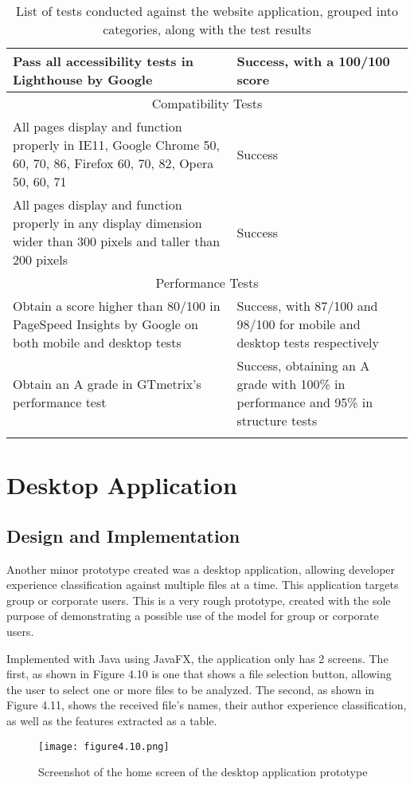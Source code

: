 \documentclass{report}
\begin{document}
\begin{longtable}[h!]{m{23em}|m{13em}}
\hline
Pass all accessibility tests in Lighthouse by Google & Success, with a 100/100 score \\
\hline
\multicolumn{2}{c}{Compatibility Tests} \\
\hline
All pages display and function properly in IE11, Google Chrome 50, 60, 70, 86, Firefox 60, 70, 82, Opera 50, 60, 71 & Success \\
\hline
All pages display and function properly in any display dimension wider than 300 pixels and taller than 200 pixels & Success \\
\hline
\multicolumn{2}{c}{Performance Tests} \\
\hline
Obtain a score higher than 80/100 in PageSpeed Insights by Google on both mobile and desktop tests & Success, with 87/100 and 98/100 for mobile and desktop tests respectively \\
\hline
Obtain an A grade in GTmetrix’s performance test & Success, obtaining an A grade with 100\% in performance and 95\% in structure tests \\
\hline
\caption{List of tests conducted against the website application, grouped into categories, along with the test results}
\label{tab:4.2}
\end{longtable}

\section{Desktop Application}

\subsection{Design and Implementation}

Another minor prototype created was a desktop application, allowing developer experience classification against multiple files at a time. This application targets group or corporate users. This is a very rough prototype, created with the sole purpose of demonstrating a possible use of the model for group or corporate users.

Implemented with Java using JavaFX, the application only has 2 screens. The first, as shown in Figure 4.10 is one that shows a file selection button, allowing the user to select one or more files to be analyzed. The second, as shown in Figure 4.11, shows the received file’s names, their author experience classification, as well as the features extracted as a table.

\begin{figure}[h!]
\centering
\texttt{[image: figure4.10.png]}
\caption{Screenshot of the home screen of the desktop application prototype}
\end{figure}
\end{document}
